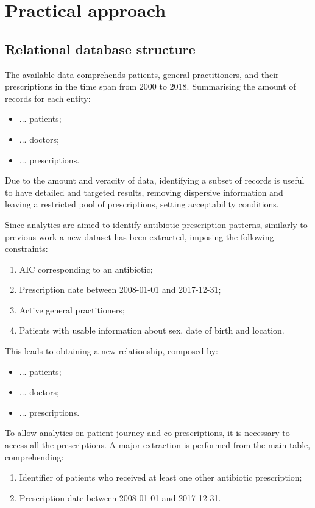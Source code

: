 \section{Practical approach}

\subsection{Relational database structure}
The available data comprehends patients, general practitioners, and their prescriptions in the time span from 2000 to 2018. Summarising the amount of records for each entity:
\begin{itemize}
	\item ... patients;
	\item ... doctors;
	\item ... prescriptions.
\end{itemize}
Due to the amount and veracity of data, identifying a subset of records is useful to have detailed and targeted results, removing dispersive information and leaving a restricted pool of prescriptions, setting acceptability conditions.

Since analytics are aimed to identify antibiotic prescription patterns, similarly to previous work a new dataset has been extracted, imposing the following constraints:
\begin{enumerate}
	\item AIC corresponding to an antibiotic;
	\item Prescription date between 2008-01-01 and 2017-12-31;
	\item Active general practitioners;
	\item Patients with usable information about sex, date of birth and location.
\end{enumerate}

This leads to obtaining a new relationship, composed by:
\begin{itemize}
	\item ... patients;
	\item ... doctors;
	\item ... prescriptions.
\end{itemize}

To allow analytics on patient journey and co-prescriptions, it is necessary to access all the prescriptions. A major extraction is performed from the main table, comprehending:
\begin{enumerate}
	\item Identifier of patients who received at least one other antibiotic prescription;
	\item Prescription date between 2008-01-01 and 2017-12-31.
\end{enumerate}

